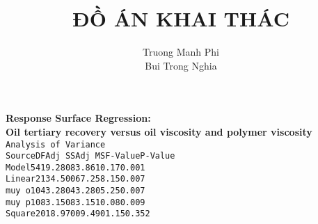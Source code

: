 \documentclass[12pt,a4paper]{article}
\title{\textbf{ĐỒ ÁN KHAI THÁC}}
\author{Truong Manh Phi\\Bui Trong Nghia}
\newcommand{\code}[1]{\texttt{#1}}
\begin{document}
\noindent
\textbf{Response Surface Regression:\\
Oil tertiary recovery versus oil viscosity and polymer viscosity}\\
\newline
\code{Analysis of Variance}\\
\newline
\code{Source}\hspace*{3cm}\code{DF}\hspace*{1cm}\code{Adj SS}\hspace*{1cm}\code{Adj MS}\hspace*{1cm}\code{F-Value}\hspace*{1cm}\code{P-Value}\\
\code{Model}\hspace*{3.5cm}\code{5}\hspace*{1cm}\code{419.28}\hspace*{1cm}\code{083.86}\hspace*{1.5cm}\code{10.17}\hspace*{1.4cm}\code{0.001}\\
\hspace*{0.5cm}\code{Linear}\hspace*{2.75cm}\code{2}\hspace*{1cm}\code{134.50}\hspace*{1cm}\code{067.25}\hspace*{1.75cm}\code{8.15}\hspace*{1.4cm}\code{0.007}\\
\hspace*{1cm}\code{muy o}\hspace*{2.5cm}\code{1}\hspace*{1cm}\code{043.28}\hspace*{1cm}\code{043.28}\hspace*{1.5cm}\code{05.25}\hspace*{1.4cm}\code{0.007}\\
\hspace*{1cm}\code{muy p}\hspace*{2.5cm}\code{1}\hspace*{1cm}\code{083.15}\hspace*{1cm}\code{083.15}\hspace*{1.5cm}\code{10.08}\hspace*{1.4cm}\code{0.009}\\
\hspace*{0.5cm}\code{Square}\hspace*{2.75cm}\code{2}\hspace*{1cm}\code{018.97}\hspace*{1cm}\code{009.49}\hspace*{1.5cm}\code{01.15}\hspace*{1.4cm}\code{0.352}\\
\end{document}
